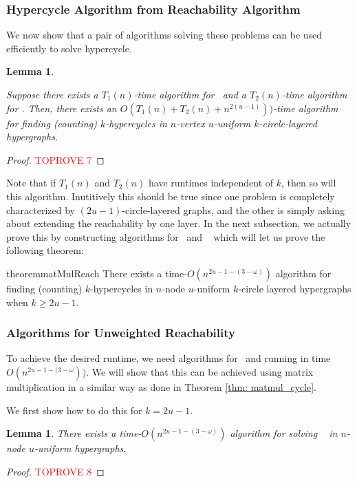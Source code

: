 \documentclass[11pt,letterpaper,pdftex]{article}
\newtheorem{lemma}[theorem]{Lemma}
\begin{document}
\subsubsection{Hypercycle Algorithm from Reachability Algorithm}

We now show that a pair of algorithms solving these problems can be used efficiently to solve hypercycle.

\begin{lemma} \label{lem: dp-like algorithm}
    
Suppose there exists a $T_1(n)$-time algorithm for \uCLR~and a $T_2(n)$-time algorithm for . 
Then, there exists an $O(T_1(n)+T_2(n)+n^{2(u-1)}))$-time algorithm for finding (counting) $k$-hypercycles in $n$-vertex $u$-uniform $k$-circle-layered hypergraphs.
\end{lemma}

\begin{proof}\textcolor{red}{TOPROVE 7}\end{proof}

Note that if $T_1(n)$ and $T_2(n)$ have runtimes independent of $k$, then so will this algorithm.
Inutitively this should be true since one problem is completely characterized by $(2u-1)$-circle-layered graphs, and the other is simply asking about extending the reachability by one layer.
In the next subsection, we actually prove this by constructing algorithms for \uCLR~and ~ which will let us prove the following theorem:


\begin{restatable}{theorem}{matMulReach}\label{thm:matmul_reachability}
There exists a time-$O(n^{2u-1-(3-\omega)})$ algorithm for finding (counting) $k$-hypercycles in $n$-node $u$-uniform $k$-circle layered hypergraphs when $k \geq 2u-1$.
\end{restatable}

\subsubsection{Algorithms for Unweighted Reachability}

To achieve the desired runtime, we need algorithms for \uCLR~and  running in time $O(n^{2u-1- (3-\omega}))$. 
We will show that this can be achieved using matrix multiplication in a similar way as done in Theorem \ref{thm: matmul_cycle}.

We first show how to do this for $k=2u-1$.
\begin{lemma} \label{lem: uECLR algorithm}
    There exists a time-$O(n^{2u-1-(3-\omega)})$ algorithm for solving \uCLR~ in $n$-node $u$-uniform hypergraphs.
\end{lemma}
\begin{proof}\textcolor{red}{TOPROVE 8}\end{proof}
\end{document}
